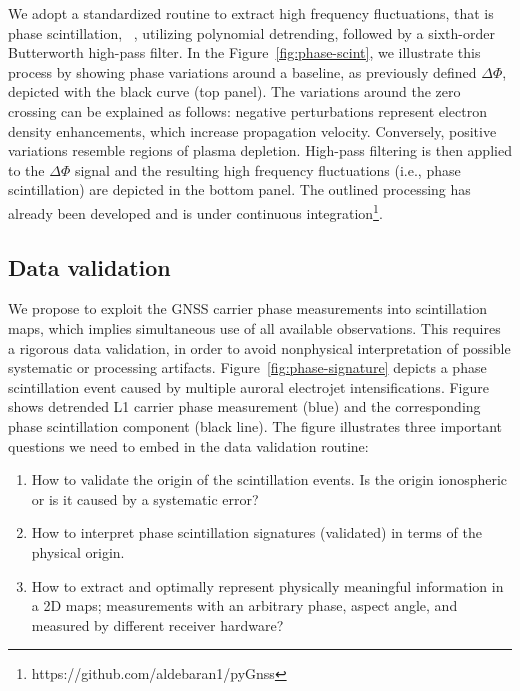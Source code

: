 \documentclass[letterpaper,12pt]{article}
\begin{document}
We adopt a standardized routine to extract high frequency fluctuations, that is phase scintillation, ~\citep{Mitchell2005, vanderMeeren2015, Mrak2018mahali}, utilizing polynomial detrending, followed by a sixth-order Butterworth high-pass filter. In the Figure~\ref{fig:phase-scint}, we illustrate this process by showing phase variations around a baseline, as previously defined $\Delta\Phi$, depicted with the black curve (top panel). The variations around the zero crossing can be explained as follows: negative perturbations represent electron density enhancements, which increase propagation velocity. Conversely, positive variations resemble regions of plasma depletion. High-pass filtering is then applied to the $\Delta\Phi$ signal and the resulting high frequency fluctuations (i.e., phase scintillation) are depicted in the bottom panel. The outlined processing has already been developed and is under continuous integration\footnote{https://github.com/aldebaran1/pyGnss}.

\vspace{-1em}\subsection{Data validation}

We propose to exploit the GNSS carrier phase measurements into scintillation maps, which implies simultaneous use of all available observations. This requires a rigorous data validation, in order to avoid nonphysical interpretation of possible systematic or processing artifacts. Figure~\ref{fig:phase-signature} depicts a phase scintillation event caused by multiple auroral electrojet intensifications. Figure shows detrended L1 carrier phase measurement (blue) and the corresponding phase scintillation component (black line). The figure illustrates three important questions we need to embed in the data validation routine:
\begin{enumerate}[leftmargin=*]
\vspace{-0.5em}
\item How to validate the origin of the scintillation events. Is the origin ionospheric or is it caused by a systematic error?
\vspace{-0.5em}
\item How to interpret phase scintillation signatures (validated) in terms of the physical origin.
\vspace{-0.5em}
\item How to extract and optimally represent physically meaningful information in a 2D maps; measurements with an arbitrary phase, aspect angle, and measured by different receiver hardware?
\end{enumerate}
\end{document}
